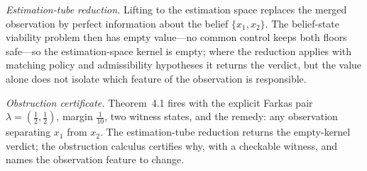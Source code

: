 \emph{Estimation-tube reduction.} Lifting to the estimation space replaces the merged observation by perfect information about the belief $\{x_1,x_2\}$. The belief-state viability problem then has empty value---no common control keeps both floors safe---so the estimation-space kernel is empty; where the reduction applies with matching policy and admissibility hypotheses it returns the verdict, but the value alone does not isolate which feature of the observation is responsible.

\emph{Obstruction certificate.} Theorem~4.1 fires with the explicit Farkas pair $\lambda=(\tfrac12,\tfrac12)$, margin $\tfrac1{10}$, two witness states, and the remedy: any observation separating $x_1$ from $x_2$. The estimation-tube reduction returns the empty-kernel verdict; the obstruction calculus certifies why, with a checkable witness, and names the observation feature to change.
